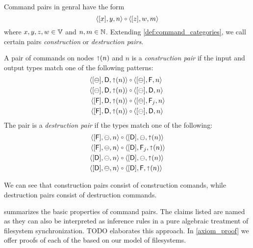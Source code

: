 \myskip
Command pairs in genral have the form
\[ \cxynv\cc  \czwmv \]
where $x,y,z,w\in\mathbb{V}$ and $n,m\in\mathbb{N}$. 
Extending \cref{def:command_categories}, we call certain pairs
\emph{construction} or \emph{destruction pairs}.

\begin{mydef}
A pair of commands on nodes $\mathord{\shortuparrow}({n})$ and $n$
is a \emph{construction pair} if the input and output types match
one of the following patterns:
   \begin{align*}
            \cbda{\pn}&\cc  \cbfa{n} \\
            \cbda{\pn}&\cc  \cbda{n} \\
            \cfda{\pn}&\cc  \caaa{\empt}{\valff}{n} \\
            \cfda{\pn}&\cc  \cbda{n}
   \end{align*}
The pair is a \emph{destruction pair} if the types match one of the following:
   \begin{align*}
            \cfba{n}&\cc  \cdba{\pn} \\
            \cfba{n}&\cc  \caaa{\vald}{\valff}{\pn} \\
            \cdba{n}&\cc  \cdba{\pn} \\
            \cdba{n}&\cc  \cdfa{\pn}
   \end{align*}
\end{mydef}

We can see that construction pairs consist of construction comands,
while destruction pairs consist of destruction commands.




 summarizes the basic properties of command pairs.
The claims listed are named \emph{}
as they can also be interpreted as inference rules in a pure
algebraic treatment of filesystem synchronization.
TODO elaborates this approach.
In \cref{axiom_proof} we offer proofs of each of the
\emph{} based on our model of filesystems.

